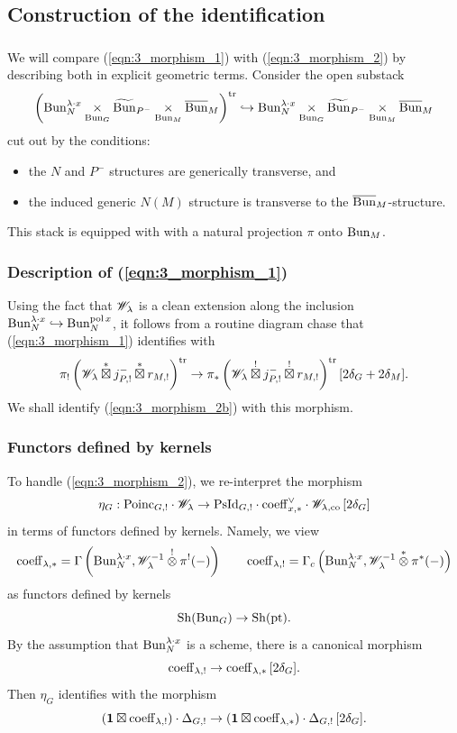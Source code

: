 \subsection{Construction of the identification}

\subsubsection{} We will compare (\ref{eqn:3_morphism_1}) with (\ref{eqn:3_morphism_2}) by describing both in explicit geometric terms. Consider the open substack
    \[
    \left( \mathrm{Bun}_N^{\lambda \cdot x} \underset{\mathrm{Bun}_G}{\times} \widetilde{\mathrm{Bun}}_{P^-} \underset{\mathrm{Bun}_M}{\times} \overline{\mathrm{Bun}}_M \right)^{\mathrm{tr}}
    \hookrightarrow \mathrm{Bun}_N^{\lambda \cdot x} \underset{\mathrm{Bun}_G}{\times} \widetilde{\mathrm{Bun}}_{P^-} \underset{\mathrm{Bun}_M}{\times} \overline{\mathrm{Bun}}_M
    \]
cut out by the conditions:
\begin{itemize}
    \item the $N$ and $P^-$ structures are generically transverse, and
    \item the induced generic $N(M)$ structure is transverse to the $\overline{\mathrm{Bun}}_M$-structure.
\end{itemize}
This stack is equipped with with a natural projection $\pi$ onto $\mathrm{Bun}_M$.

\subsubsection{Description of (\ref{eqn:3_morphism_1})} Using the fact that $\mathscr{W}_\lambda$ is a clean extension along the inclusion $\mathrm{Bun}_N^{\lambda \cdot x} \hookrightarrow \mathrm{Bun}_N^{\mathrm{pol}\,x}$, it follows from a routine diagram chase that (\ref{eqn:3_morphism_1}) identifies with
    \[
    \pi_! \left( \mathscr{W}_\lambda \overset{*}{\boxtimes} j_{P,!}^- \overset{*}{\boxtimes} r_{M,!} \right)^{\mathrm{tr}} 
    \to \pi_* \left( \mathscr{W}_\lambda \overset{!}{\boxtimes} j_{P,!}^- \overset{!}{\boxtimes} r_{M,!} \right)^{\mathrm{tr}} [2 \delta_G + 2 \delta_M].
    \]
We shall identify (\ref{eqn:3_morphism_2b}) with this morphism.

\subsubsection{Functors defined by kernels} To handle (\ref{eqn:3_morphism_2}), we re-interpret the morphism
    \[
    \eta_G : \mathrm{Poinc}_{G,!} \cdot \mathscr{W}_\lambda 
    \to \mathrm{PsId}_{G,!} \cdot \mathrm{coeff}_{x, *}^\vee \cdot \mathscr{W}_{\lambda, \mathrm{co}} \, [2 \delta_G]
    \]
in terms of functors defined by kernels. Namely, we view
    \[
    \mathrm{coeff}_{\lambda, *} = \Gamma\left( \mathrm{Bun}_N^{\lambda \cdot x}, \mathscr{W}_\lambda^{-1} \overset{!}{\otimes} \pi^!(-) \right)
    \qquad
    \mathrm{coeff}_{\lambda, !} = \Gamma_c\left(\mathrm{Bun}_N^{\lambda \cdot x}, \mathscr{W}_\lambda^{-1} \overset{*}{\otimes} \pi^*(-) \right)
    \]
as functors defined by kernels
    \[
    \mathrm{Sh}(\mathrm{Bun}_G) \to \mathrm{Sh}(\mathrm{pt}).
    \]
By the assumption that $\mathrm{Bun}_N^{\lambda \cdot x}$ is a scheme, there is a canonical morphism
    \[\mathrm{coeff}_{\lambda, !} \to \mathrm{coeff}_{\lambda, *} \, [2 \delta_G].\]
Then $\eta_G$ identifies with the morphism
    \[
    (\mathbf{1} \boxtimes \mathrm{coeff}_{\lambda,!}) \cdot \Delta_{G,!} 
    \to (\mathbf{1} \boxtimes \mathrm{coeff}_{\lambda, *}) \cdot \Delta_{G,!} \, [2 \delta_G].
    \]

